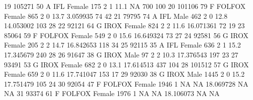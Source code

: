 \documentclass[
]{book}
\newenvironment{Shaded}{\begin{snugshade}}{\end{snugshade}}
\newcommand{\DecValTok}[1]{\textcolor[rgb]{0.00,0.00,0.81}{#1}}
\newcommand{\FloatTok}[1]{\textcolor[rgb]{0.00,0.00,0.81}{#1}}
\newcommand{\NormalTok}[1]{#1}
\newcommand{\OtherTok}[1]{\textcolor[rgb]{0.56,0.35,0.01}{#1}}
\begin{document}
\begin{Shaded}
\begin{Highlighting}[]
\DecValTok{19} \DecValTok{105271}  \DecValTok{50}\NormalTok{    A IFL Female    }\DecValTok{175}      \DecValTok{2}  \DecValTok{1} \FloatTok{11.1}        \OtherTok{NA}     \DecValTok{700} \DecValTok{100}
\DecValTok{20} \DecValTok{101106}  \DecValTok{79}\NormalTok{ F FOLFOX Female    }\DecValTok{865}      \DecValTok{2}  \DecValTok{0} \FloatTok{13.7}  \FloatTok{3.059935}      \DecValTok{74}  \DecValTok{42}
\DecValTok{21}  \DecValTok{79795}  \DecValTok{74}\NormalTok{    A IFL   Male    }\DecValTok{462}      \DecValTok{2}  \DecValTok{0} \FloatTok{12.8} \FloatTok{14.053002}     \DecValTok{103}  \DecValTok{28}
\DecValTok{22}  \DecValTok{92121}  \DecValTok{64}\NormalTok{   G IROX Female    }\DecValTok{824}      \DecValTok{2}  \DecValTok{2} \FloatTok{11.6} \FloatTok{16.071361}      \DecValTok{72}  \DecValTok{19}
\DecValTok{23}  \DecValTok{85064}  \DecValTok{59}\NormalTok{ F FOLFOX Female    }\DecValTok{549}      \DecValTok{2}  \DecValTok{0} \FloatTok{15.6} \FloatTok{16.649324}      \DecValTok{73}  \DecValTok{27}
\DecValTok{24}  \DecValTok{92581}  \DecValTok{56}\NormalTok{   G IROX Female    }\DecValTok{205}      \DecValTok{2}  \DecValTok{2} \FloatTok{14.7} \FloatTok{16.842653}     \DecValTok{118}  \DecValTok{34}
\DecValTok{25}  \DecValTok{92115}  \DecValTok{35}\NormalTok{    A IFL Female    }\DecValTok{636}      \DecValTok{2}  \DecValTok{1} \FloatTok{15.2} \FloatTok{17.345679}     \DecValTok{240}  \DecValTok{28}
\DecValTok{26}  \DecValTok{91647}  \DecValTok{38}\NormalTok{   G IROX   Male     }\DecValTok{97}      \DecValTok{2}  \DecValTok{2} \FloatTok{10.3} \FloatTok{17.376543}     \DecValTok{197}  \DecValTok{23}
\DecValTok{27}  \DecValTok{93491}  \DecValTok{53}\NormalTok{   G IROX Female    }\DecValTok{682}      \DecValTok{2}  \DecValTok{0} \FloatTok{13.1} \FloatTok{17.614513}     \DecValTok{437} \DecValTok{104}
\DecValTok{28} \DecValTok{101512}  \DecValTok{57}\NormalTok{   G IROX Female    }\DecValTok{659}      \DecValTok{2}  \DecValTok{0} \FloatTok{11.6} \FloatTok{17.741047}     \DecValTok{153}  \DecValTok{17}
\DecValTok{29}  \DecValTok{92030}  \DecValTok{38}\NormalTok{   G IROX   Male   }\DecValTok{1445}      \DecValTok{2}  \DecValTok{0} \FloatTok{15.2} \FloatTok{17.751479}     \DecValTok{105}  \DecValTok{24}
\DecValTok{30}  \DecValTok{92054}  \DecValTok{47}\NormalTok{ F FOLFOX Female   }\DecValTok{1946}      \DecValTok{1} \OtherTok{NA}   \OtherTok{NA} \FloatTok{18.069728}      \OtherTok{NA}  \OtherTok{NA}
\DecValTok{31}  \DecValTok{93374}  \DecValTok{61}\NormalTok{ F FOLFOX Female   }\DecValTok{1976}      \DecValTok{1} \OtherTok{NA}   \OtherTok{NA} \FloatTok{18.106073}      \OtherTok{NA}  \OtherTok{NA}

\end{Highlighting}
\end{Shaded}
\end{document}
